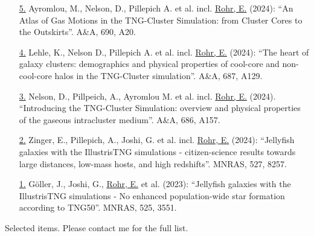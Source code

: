 \documentclass[a4paper,10pt,oneside]{article}
\begin{document}
\begin{enumerate}[wide, labelwidth=!, labelindent=-11pt, parsep=0pt]
    \item[\href{https://www.aanda.org/articles/aa/abs/2024/10/aa48612-23/aa48612-23.html}{5.}] Ayromlou, M., Nelson, D., Pillepich A. et al. incl. \underline{Rohr, E.} (2024): ``An Atlas of Gas Motions in the TNG-Cluster Simulation: from Cluster Cores to the Outskirts''. A\&A, 690, A20.
    \item[\href{https://ui.adsabs.harvard.edu/abs/2024A\%26A...687A.129L/abstract}{4.}] Lehle, K., Nelson D., Pillepich A. et al. incl. \underline{Rohr, E.} (2024): ``The heart of galaxy clusters: demographics and physical properties of cool-core and non-cool-core halos in the TNG-Cluster simulation''. A\&A, 687, A129.
    \item[\href{https://ui.adsabs.harvard.edu/abs/2024A&A...686A.157N/abstract}{3.}] Nelson, D., Pillpeich, A., Ayromlou M. et al. incl. \underline{Rohr, E.} (2024). ``Introducing the TNG-Cluster Simulation: overview and physical properties of the gaseous intracluster medium''. A\&A, 686, A157.
    \item[\href{https://ui.adsabs.harvard.edu/abs/2024MNRAS.527.8257Z/abstract}{2.}] Zinger, E., Pillepich, A., Joshi, G. et al. incl. \underline{Rohr, E.} (2024): ``Jellyfish galaxies with the IllustrisTNG simulations - citizen-science results towards large distances, low-mass hosts, and high redshifts''. MNRAS, 527, 8257.
    \item[\href{https://ui.adsabs.harvard.edu/abs/2023MNRAS.525.3551G/abstract}{1.}] G{\"o}ller, J., Joshi, G., \underline{Rohr, E.} et al. (2023): ``Jellyfish galaxies with the IllustrisTNG simulations - No enhanced population-wide star formation according to TNG50''. MNRAS, 525, 3551.
\end{enumerate}

\noindent{}

\vspace{5.5pt}

\noindent Selected items. Please contact me for the full list.
\end{document}
